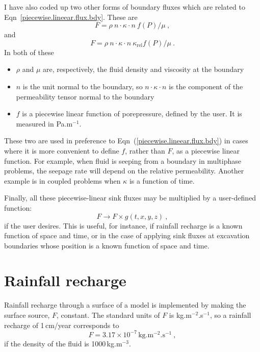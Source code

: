 \documentclass[]{scrreprt}
\begin{document}
I have also coded up two other forms of
boundary fluxes which are related to
Eqn~\ref{piecewise.lineear.flux.bdy}.  These are
\begin{equation}
F = \rho\ n\cdot\kappa\cdot n \ f(P)/\mu \ ,
\end{equation}
and
\begin{equation}
F = \rho \ n\cdot\kappa\cdot n\ \kappa_{\mathrm{rel}} f(P)/\mu \ .
\end{equation}
In both of these
\begin{itemize}
\item $\rho$ and $\mu$ are, respectively, the fluid density and
  viscosity at the boundary
\item $n$ is the unit normal to the boundary, so $n \cdot \kappa \cdot
  n$ is the component of the permeability tensor normal to the
  boundary
\item $f$ is a piecewise linear function of porepressure, defined by
  the user.  It is measured in Pa.m$^{-1}$.
\end{itemize}
These two are used in preference to
Eqn~(\ref{piecewise.lineear.flux.bdy}) in cases where it is more
convenient to define $f$, rather than $F$, as a piecewise linear
function.  For example, when fluid is seeping from a boundary in
multiphase problems, the seepage rate will depend on the relative
permeability.  Another example is in coupled problems when $\kappa$ is
a function of time.

Finally, all these piecewise-linear sink fluxes may be multiplied by a
user-defined function:
\begin{equation}
F \rightarrow F\times g(t, x, y, z) \ ,
\end{equation}
if the user desires.  This is useful, for instance, if rainfall
recharge is a known function of space and time, or in the case of
applying sink fluxes at excavation boundaries whose position is a
known function of space and time.





\section{Rainfall recharge}
\label{rainfall.recharge.sec}

Rainfall recharge through a surface of a model is implemented by
making the surface source, $F$, constant.  The standard
units of $F$ is kg.m$^{-2}$.s$^{-1}$, so a rainfall recharge of
1\,cm/year corresponds to
\begin{equation}
F = 3.17\times 10^{-7}\,\mbox{kg.m$^{-2}$.s$^{-1}$} \ ,
\end{equation}
if the density of the fluid is 1000\,kg.m$^{-3}$.
\end{document}
